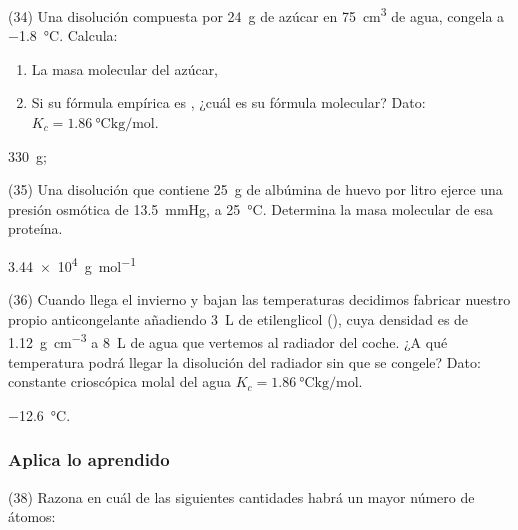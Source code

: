 \documentclass[10pt]{article}
\begin{document}
\begin{multicols}{2}
\begin{exercise}
  (34) Una disolución compuesta por \SI{24}{\gram} de azúcar en \SI{75}{\cubic\centi\meter} de agua, congela a \SI{-1.8}{\celsius}. Calcula:
  \begin{enumerate}
    \item La masa molecular del azúcar,
    \item Si su fórmula empírica es , ¿cuál es su fórmula molecular? Dato: \( K_c = \SI{1.86}{\celsius\kilo\gram\per\mole} \).
  \end{enumerate}
\end{exercise}
\begin{solution}
  \begin{enumerate*}
    \item \SI{330}{\gram};
    \item {}
  \end{enumerate*}
\end{solution}

\begin{exercise}
  (35) Una disolución que contiene \SI{25}{\gram} de albúmina de
  huevo por litro ejerce una presión osmótica de \SI{13.5}{\mmHg}, a
  \SI{25}{\celsius}. Determina la masa molecular de esa proteína.
\end{exercise}
\begin{solution}
  \SI{3.44e4}{\gram\per\mole}
\end{solution}

\begin{exercise}
  (36) Cuando llega el invierno y bajan las temperaturas decidimos
  fabricar nuestro propio anticongelante añadiendo \SI{3}{\liter} de
  etilenglicol (), cuya densidad es de \SI{1.12}{\gram\per\cubic\centi\meter} a \SI{8}{\liter}
  de agua que vertemos al radiador del coche. ¿A qué temperatura
  podrá llegar la disolución del radiador sin que se congele?
  Dato: constante crioscópica molal del agua \( K_c = \SI{1.86}{\celsius\kilo\gram\per\mole} \).
\end{exercise}
\begin{solution}
  \SI{-12.6}{\celsius}.
\end{solution}



\subsubsection{Aplica lo aprendido}

\begin{exercise}
  (38) Razona en cuál de las siguientes cantidades habrá un mayor número de átomos:


\end{exercise}
\end{multicols}
\end{document}
